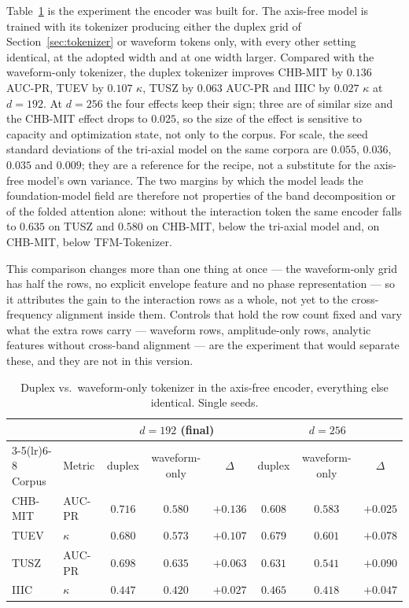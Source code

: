 Table~\ref{tab:attribution} is the experiment the encoder was built for.
The axis-free model is trained with its tokenizer producing either the
duplex grid of Section~\ref{sec:tokenizer} or waveform tokens only, with
every other setting identical, at the adopted width and at one width
larger. Compared with the waveform-only tokenizer, the duplex tokenizer improves
CHB-MIT by $0.136$ AUC-PR, TUEV by $0.107$ $\kappa$, TUSZ by $0.063$ AUC-PR
and IIIC by $0.027$ $\kappa$ at $d{=}192$. At $d{=}256$ the four effects keep their sign; three
are of similar size and the CHB-MIT effect drops to $0.025$, so the size
of the effect is sensitive to capacity and optimization state, not only
to the corpus. For scale, the seed standard deviations of the tri-axial
model on the same corpora are $0.055$, $0.036$, $0.035$ and $0.009$; they
are a reference for the recipe, not a substitute for the axis-free
model's own variance. The two margins by which the model leads the
foundation-model field are therefore not properties of the band
decomposition or of the folded attention alone: without the interaction
token the same encoder falls to $0.635$ on TUSZ and $0.580$ on CHB-MIT,
below the tri-axial model and, on CHB-MIT, below TFM-Tokenizer.

This comparison changes more than one thing at once --- the waveform-only
grid has half the rows, no explicit envelope feature and no phase
representation --- so it attributes the gain to the interaction rows as a
whole, not yet to the cross-frequency alignment inside them. Controls
that hold the row count fixed and vary what the extra rows carry ---
waveform rows, amplitude-only rows, analytic features without cross-band
alignment --- are the experiment that would separate these, and they are
not in this version.

\begin{table}[t]
\centering
\small
\caption{Duplex vs.\ waveform-only tokenizer in the axis-free encoder,
everything else identical. Single seeds.}
\label{tab:attribution}
\begin{tabular}{llcccccc}
\toprule
 & & \multicolumn{3}{c}{$d{=}192$ (final)} & \multicolumn{3}{c}{$d{=}256$} \\
\cmidrule(lr){3-5}\cmidrule(lr){6-8}
Corpus & Metric & duplex & waveform-only & $\Delta$ & duplex & waveform-only & $\Delta$ \\
\midrule
CHB-MIT & AUC-PR & $\mathbf{0.716}$ & $0.580$ & $\mathbf{+0.136}$ & $0.608$ & $0.583$ & $+0.025$ \\
TUEV & $\kappa$ & $\mathbf{0.680}$ & $0.573$ & $\mathbf{+0.107}$ & $0.679$ & $0.601$ & $+0.078$ \\
TUSZ & AUC-PR & $\mathbf{0.698}$ & $0.635$ & $\mathbf{+0.063}$ & $0.631$ & $0.541$ & $+0.090$ \\
IIIC & $\kappa$ & $\mathbf{0.447}$ & $0.420$ & $+0.027$ & $0.465$ & $0.418$ & $+0.047$ \\
\bottomrule
\end{tabular}
\end{table}

